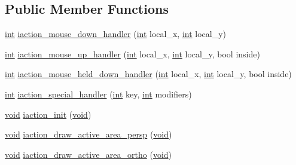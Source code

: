 \subsection*{Public Member Functions}
\begin{DoxyCompactItemize}
\item 
\hyperlink{wglext_8h_a500a82aecba06f4550f6849b8099ca21}{int} \hyperlink{class_g_l_u_i___translation_a92ca690a16b858d761aa9e12ac44ec13}{iaction\+\_\+mouse\+\_\+down\+\_\+handler} (\hyperlink{wglext_8h_a500a82aecba06f4550f6849b8099ca21}{int} local\+\_\+x, \hyperlink{wglext_8h_a500a82aecba06f4550f6849b8099ca21}{int} local\+\_\+y)
\item 
\hyperlink{wglext_8h_a500a82aecba06f4550f6849b8099ca21}{int} \hyperlink{class_g_l_u_i___translation_a7674b5641e87b9d73a590a9cbfd83783}{iaction\+\_\+mouse\+\_\+up\+\_\+handler} (\hyperlink{wglext_8h_a500a82aecba06f4550f6849b8099ca21}{int} local\+\_\+x, \hyperlink{wglext_8h_a500a82aecba06f4550f6849b8099ca21}{int} local\+\_\+y, bool inside)
\item 
\hyperlink{wglext_8h_a500a82aecba06f4550f6849b8099ca21}{int} \hyperlink{class_g_l_u_i___translation_a2d13c80e8d6d16378a2f0ceecda7a3c4}{iaction\+\_\+mouse\+\_\+held\+\_\+down\+\_\+handler} (\hyperlink{wglext_8h_a500a82aecba06f4550f6849b8099ca21}{int} local\+\_\+x, \hyperlink{wglext_8h_a500a82aecba06f4550f6849b8099ca21}{int} local\+\_\+y, bool inside)
\item 
\hyperlink{wglext_8h_a500a82aecba06f4550f6849b8099ca21}{int} \hyperlink{class_g_l_u_i___translation_a4bdc9a327c975a24546e2733f5f5cb01}{iaction\+\_\+special\+\_\+handler} (\hyperlink{wglext_8h_a500a82aecba06f4550f6849b8099ca21}{int} key, \hyperlink{wglext_8h_a500a82aecba06f4550f6849b8099ca21}{int} modifiers)
\item 
\hyperlink{wglext_8h_a9e6b7f1933461ef318bb000d6bd13b83}{void} \hyperlink{class_g_l_u_i___translation_abacc8d8aa4e4a99ab8c6965256ab2bb0}{iaction\+\_\+init} (\hyperlink{wglext_8h_a9e6b7f1933461ef318bb000d6bd13b83}{void})
\item 
\hyperlink{wglext_8h_a9e6b7f1933461ef318bb000d6bd13b83}{void} \hyperlink{class_g_l_u_i___translation_affbd229a3bb1b680fccfd394a8277440}{iaction\+\_\+draw\+\_\+active\+\_\+area\+\_\+persp} (\hyperlink{wglext_8h_a9e6b7f1933461ef318bb000d6bd13b83}{void})
\item 
\hyperlink{wglext_8h_a9e6b7f1933461ef318bb000d6bd13b83}{void} \hyperlink{class_g_l_u_i___translation_a78821a339feee6944df3dacbcd7867eb}{iaction\+\_\+draw\+\_\+active\+\_\+area\+\_\+ortho} (\hyperlink{wglext_8h_a9e6b7f1933461ef318bb000d6bd13b83}{void})

\end{DoxyCompactItemize}
